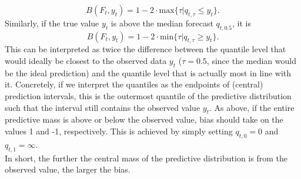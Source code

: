 \begin{equation*}
B(F_t, y_t) = 1 - 2 \cdot \text{max}\{\tau | q_{t,\tau} \leq y_t \}.
\end{equation*}
Similarly, if the true value $y_t$ is above the median forecast $q_{t,0.5}$, it is
\begin{equation*}
B(F_t, y_t) = 1 - 2 \cdot \text{min}\{\tau | q_{t,\tau} \geq y_t \}.
\end{equation*}
This can be interpreted as twice the difference between the quantile level that would ideally be closest to the observed data $y_t$ ($\tau = 0.5$, since the median would be the ideal prediction) and the quantile level that is actually most in line with it. Concretely, if we interpret the quantiles as the endpoints of (central) prediction intervals, this is the outermost quantile of the predictive distribution such that the interval still contains the observed value $y_t$. As above, if the entire predictive mass is above or below the observed value, bias should take on the values 1 and -1, respectively. This is achieved by simply setting $q_{t,0} = 0$ and $q_{t,1} = \infty$.\\
In short, the further the central mass of the predictive distribution is from the observed value, the larger the bias.\\
